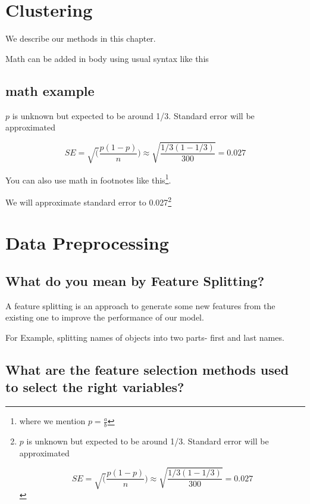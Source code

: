 \documentclass[
]{book}
\begin{document}
\hypertarget{clustering-1}{%
\chapter{Clustering}\label{clustering-1}}

We describe our methods in this chapter.

Math can be added in body using usual syntax like this

\hypertarget{math-example}{%
\section{math example}\label{math-example}}

\(p\) is unknown but expected to be around 1/3. Standard error will be approximated

\[
SE = \sqrt(\frac{p(1-p)}{n}) \approx \sqrt{\frac{1/3 (1 - 1/3)} {300}} = 0.027
\]

You can also use math in footnotes like this\footnote{where we mention \(p = \frac{a}{b}\)}.

We will approximate standard error to 0.027\footnote{\(p\) is unknown but expected to be around 1/3. Standard error will be approximated

  \[
  SE = \sqrt(\frac{p(1-p)}{n}) \approx \sqrt{\frac{1/3 (1 - 1/3)} {300}} = 0.027
  \]}

\hypertarget{data-preprocessing}{%
\chapter{Data Preprocessing}\label{data-preprocessing}}

\hypertarget{what-do-you-mean-by-feature-splitting}{%
\section{What do you mean by Feature Splitting?}\label{what-do-you-mean-by-feature-splitting}}

A feature splitting is an approach to generate some new features from the existing one to improve the performance of our model.

For Example, splitting names of objects into two parts- first and last names.

\hypertarget{what-are-the-feature-selection-methods-used-to-select-the-right-variables}{%
\section{What are the feature selection methods used to select the right variables?}\label{what-are-the-feature-selection-methods-used-to-select-the-right-variables}}
\end{document}
